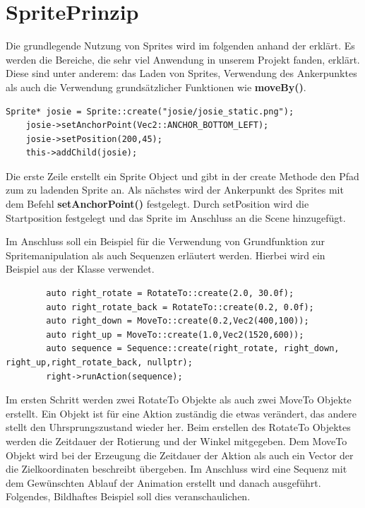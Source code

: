 \section{SpritePrinzip}
Die grundlegende Nutzung von Sprites wird im folgenden anhand der  erklärt. Es werden die Bereiche, die sehr viel Anwendung in unserem Projekt fanden, erklärt. Diese sind unter anderem: das Laden von Sprites, Verwendung des Ankerpunktes als auch die Verwendung grundsätzlicher Funktionen wie \textbf{moveBy()}.

\begin{lstlisting}
Sprite* josie = Sprite::create("josie/josie_static.png");
	josie->setAnchorPoint(Vec2::ANCHOR_BOTTOM_LEFT);
	josie->setPosition(200,45);
	this->addChild(josie);
\end{lstlisting}

Die erste Zeile erstellt ein Sprite Object und gibt in der create Methode den Pfad zum zu ladenden Sprite an. Als nächstes wird der Ankerpunkt des Sprites mit dem Befehl \textbf{setAnchorPoint()} festgelegt. Durch setPosition wird die Startposition festgelegt und das Sprite im Anschluss an die Scene hinzugefügt. 


Im Anschluss soll ein Beispiel für die Verwendung von Grundfunktion zur Spritemanipulation als auch Sequenzen erläutert werden. Hierbei wird ein Beispiel aus der Klasse  verwendet.

\begin{lstlisting}
		auto right_rotate = RotateTo::create(2.0, 30.0f);
		auto right_rotate_back = RotateTo::create(0.2, 0.0f);
		auto right_down = MoveTo::create(0.2,Vec2(400,100));
		auto right_up = MoveTo::create(1.0,Vec2(1520,600));
		auto sequence = Sequence::create(right_rotate, right_down, right_up,right_rotate_back, nullptr);
		right->runAction(sequence);
\end{lstlisting}

Im ersten Schritt werden zwei RotateTo Objekte als auch zwei MoveTo Objekte erstellt. Ein Objekt ist für eine Aktion zuständig die etwas verändert, das andere stellt den Uhrsprungszustand wieder her. Beim erstellen des RotateTo Objektes werden die Zeitdauer der Rotierung und der Winkel mitgegeben. Dem MoveTo Objekt wird bei der Erzeugung die Zeitdauer der Aktion als auch ein Vector der die Zielkoordinaten beschreibt übergeben. Im Anschluss wird eine Sequenz mit dem Gewünschten Ablauf der Animation erstellt und danach ausgeführt. Folgendes, Bildhaftes Beispiel soll dies veranschaulichen. 


